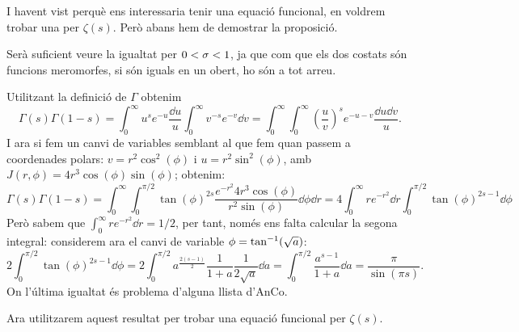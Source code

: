I havent vist perquè ens interessaria tenir una equació funcional, en voldrem trobar una per $\zeta(s)$. Però abans hem de demostrar la proposició.
\begin{pf}
    Serà suficient veure la igualtat per $0<\sigma<1$, ja que com que els dos costats són funcions meromorfes, si són iguals en un obert, ho són a tot arreu.\par
    Utilitzant la definició de $\Gamma$ obtenim
    \[
        \Gamma(s)\Gamma(1-s)=
        \int_{0}^{\infty}u^{s}e^{-u}\frac{\dd u}{u}
        \int_{0}^{\infty}v^{-s}e^{-v}\dd v=
        \int_{0}^{\infty}
        \int_{0}^{\infty}
        \left(\frac{u}{v}\right)^se^{-u-v}\frac{\dd u\dd v}{u}.
    \]
    I ara si fem un canvi de variables semblant al que fem quan passem a coordenades polars: $v=r^2\cos^2(\phi)$ i $u = r^2\sin^2(\phi)$, amb $J(r,\phi)=4r^3\cos(\phi)\sin(\phi)$; obtenim:
    \[
        \Gamma(s)\Gamma(1-s)=
        \int_{0}^{\infty}\int_{0}^{\pi/2}\tan(\phi)^{2s}\frac{e^{-r^2}4r^3\cos(\phi)}{r^2\sin(\phi)}
        \dd \phi\dd r = 
        4\int_{0}^{\infty}re^{-r^2}\dd r \int_{0}^{\pi/2}\tan(\phi)^{2s-1}\dd \phi 
    \]
    Però sabem que $\int_{0}^{\infty}re^{-r^2}\dd r=1/2$, per tant, només ens falta calcular la segona integral: considerem ara el canvi de variable $\phi=\tan^{-1}(\sqrt{a})$:
    \[
        2\int_{0}^{\pi/2}\tan(\phi)^{2s-1}\dd \phi =
        2\int_{0}^{\pi/2}a^{\frac{2(s-1)}{2}}\frac{1}{1+a}\frac{1}{2\sqrt a}\dd a=
        \int_{0}^{\pi/2}\frac{a^{s-1}}{1+a}\dd a=\frac{\pi}{\sin(\pi s)}.
    \]
    On l'última igualtat és problema d'alguna llista d'AnCo.
\end{pf}
Ara utilitzarem aquest resultat per trobar una equació funcional per $\zeta(s)$.

